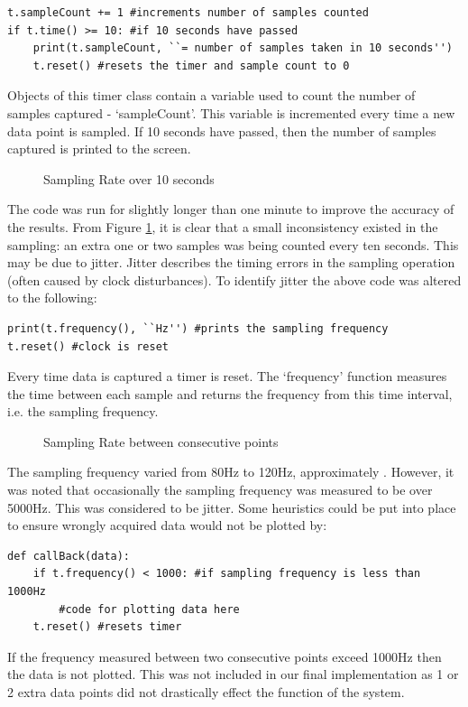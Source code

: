 \documentclass{article}
\begin{document}
\lstset{language=Python}
\begin{lstlisting}
t.sampleCount += 1 #increments number of samples counted
if t.time() >= 10: #if 10 seconds have passed
    print(t.sampleCount, ``= number of samples taken in 10 seconds'')
    t.reset() #resets the timer and sample count to 0
\end{lstlisting}
Objects of this timer class contain a variable used to count the number of samples captured - `sampleCount'. This variable is incremented every time a new data point is sampled. If 10 seconds have passed, then the number of samples captured is printed to the screen.
\newline
\begin{figure}[H]
    \centering
    
    \caption{Sampling Rate over 10 seconds}
    \label{fig:tenSecs}
\end{figure}
\newline 
The code was run for slightly longer than one minute to improve the accuracy of the results. From Figure \ref{fig:tenSecs}, it is clear that a small inconsistency existed in the sampling: an extra one or two samples was being counted every ten seconds. This may be due to jitter. Jitter describes the timing errors in the sampling operation (often caused by clock disturbances). To identify jitter the above code was altered to the following:
\lstset{language=Python}
\begin{lstlisting}
print(t.frequency(), ``Hz'') #prints the sampling frequency
t.reset() #clock is reset
\end{lstlisting}
Every time data is captured a timer is reset. The `frequency' function measures the time between each sample and returns the frequency from this time interval, i.e. the sampling frequency.
\newline
\begin{figure}[H]
    \centering
    
    \caption{Sampling Rate between consecutive points}
    \label{fig:sampleF}
\end{figure}
\newline 
The sampling frequency varied from 80Hz to 120Hz, approximately . However, it was noted that occasionally the sampling frequency was measured to be over 5000Hz. This was considered to be jitter. Some heuristics could be put into place to ensure wrongly acquired data would not be plotted by:
\lstset{language=Python}
\begin{lstlisting}
def callBack(data):
    if t.frequency() < 1000: #if sampling frequency is less than 1000Hz
        #code for plotting data here
    t.reset() #resets timer
\end{lstlisting}
If the frequency measured between two consecutive points exceed 1000Hz then the data is not plotted. This was not included in our final implementation as 1 or 2 extra data points did not drastically effect the function of the system.
\end{document}
